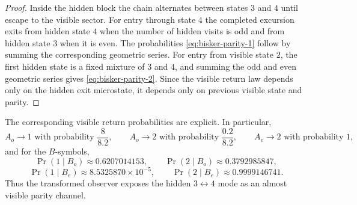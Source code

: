 \documentclass[11pt]{article}
\numberwithin{equation}{section}
\theoremstyle{thmcompact}
\theoremstyle{remark}
\begin{document}
\begin{proof}
Inside the hidden block the chain alternates between states $3$ and $4$ until escape to the visible sector. For entry through state $4$ the completed excursion exits from hidden state $4$ when the number of hidden visits is odd and from hidden state $3$ when it is even. The probabilities \eqref{eq:bisker-parity-1} follow by summing the corresponding geometric series. For entry from visible state $2$, the first hidden state is a fixed mixture of $3$ and $4$, and summing the odd and even geometric series gives \eqref{eq:bisker-parity-2}. Since the visible return law depends only on the hidden exit microstate, it depends only on previous visible state and parity.
\end{proof}

The corresponding visible return probabilities are explicit. In particular,
\begin{equation}\label{eq:bisker-return-A}
A_o\to1 \text{ with probability } \frac{8}{8.2},
\qquad
A_o\to2 \text{ with probability } \frac{0.2}{8.2},
\qquad
A_e\to2 \text{ with probability }1,
\end{equation}
and for the $B$-symbols,
\begin{equation}\label{eq:bisker-return-B}
\Pr(1\mid B_o)\approx 0.6207014153,
\qquad
\Pr(2\mid B_o)\approx 0.3792985847,
\end{equation}
\begin{equation}\label{eq:bisker-return-Be}
\Pr(1\mid B_e)\approx 8.5325870\times 10^{-5},
\qquad
\Pr(2\mid B_e)\approx 0.9999146741.
\end{equation}
Thus the transformed observer exposes the hidden $3\leftrightarrow4$ mode as an almost visible parity channel.
\end{document}
